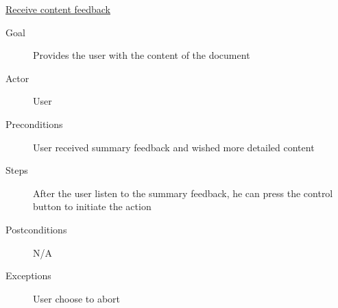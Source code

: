 \vspace{5mm}
\pagebreak

\underline {Receive content feedback}
\begin{description}
\item [Goal] Provides the user with the content of the document
\item [Actor] User
\item [Preconditions] User received summary feedback and wished more detailed content
\item [Steps] After the user listen to the summary feedback, he can press the control button to initiate the action
\item [Postconditions] N/A
\item [Exceptions] User choose to abort
\end{description}


